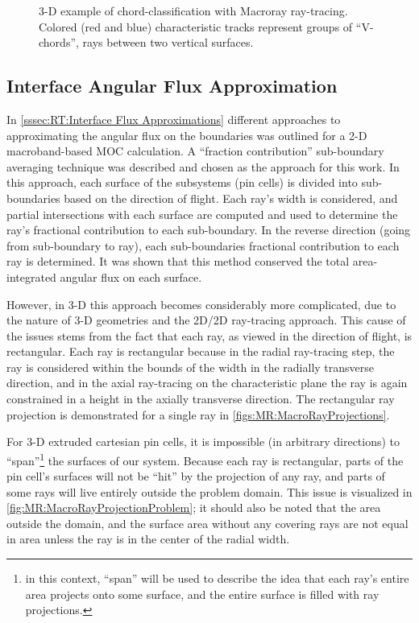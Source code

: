 {{{      \begin{figure}[h]
        \centering
        \def\svgwidth{0.45\linewidth}
        
        \caption{3-D example of chord-classification with Macroray ray-tracing. Colored (red and blue) characteristic tracks represent groups of ``V-chords'', rays between two vertical surfaces.}
        \label{fig:RT:Chord-Classification Macroray}
      \end{figure}
    }

    \subsection{Interface Angular Flux Approximation}{\label{ssec:MR:Interface Angular Flux Approximation}
      In \cref{sssec:RT:Interface Flux Approximations} different approaches to approximating the angular flux on the boundaries was outlined for a 2-D macroband-based \ac{MOC} calculation.
      A ``fraction contribution'' sub-boundary averaging technique was described and chosen as the approach for this work.
      In this approach, each surface of the subsystems (pin cells) is divided into sub-boundaries based on the direction of flight.
      Each ray's width is considered, and partial intersections with each surface are computed and used to determine the ray's fractional contribution to each sub-boundary.
      In the reverse direction (going from sub-boundary to ray), each sub-boundaries fractional contribution to each ray is determined.
      It was shown that this method conserved the total area-integrated angular flux on each surface.

      However, in 3-D this approach becomes considerably more complicated, due to the nature of 3-D geometries and the 2D/2D ray-tracing approach.
      This cause of the issues stems from the fact that each ray, as viewed in the direction of flight, is rectangular.
      Each ray is rectangular because in the radial ray-tracing step, the ray is considered within the bounds of the width in the radially transverse direction, and in the axial ray-tracing on the characteristic plane the ray is again constrained in a height in the axially transverse direction.
      The rectangular ray projection is demonstrated for a single ray in \cref{figs:MR:MacroRayProjections}.

      For 3-D extruded cartesian pin cells, it is impossible (in arbitrary directions) to ``span''\footnote{in this context, ``span'' will be used to describe the idea that each ray's entire area projects onto some surface, and the entire surface is filled with ray projections.} the surfaces of our system.
      Because each ray is rectangular, parts of the pin cell's surfaces will not be ``hit'' by the projection of any ray, and parts of some rays will live entirely outside the problem domain.
      This issue is visualized in \cref{fig:MR:MacroRayProjectionProblem}; it should also be noted that the area outside the domain, and the surface area without any covering rays are not equal in area unless the ray is in the center of the radial width.

}}}
